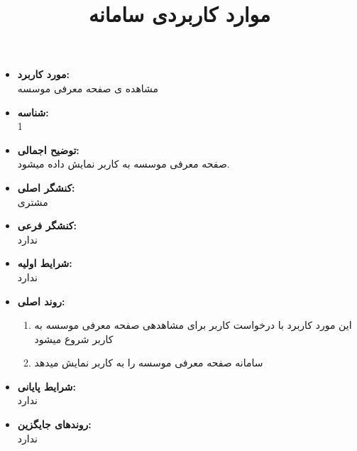 \documentclass{article}
\title{موارد کاربردی سامانه}
\begin{document}
\maketitle
\begin{itemize}
\item \textbf{مورد کاربرد:}\\
مشاهده ی صفحه معرفی موسسه
\item \textbf{شناسه:}\\
1
\item \textbf{توضیح اجمالی:}\\
صفحه معرفی موسسه به کاربر نمایش داده میشود. 
\item \textbf{کنشگر اصلی:}\\
مشتری
\item \textbf{کنشگر فرعی:}\\
ندارد
\item \textbf{شرایط اولیه:}\\
ندارد
\item \textbf{روند اصلی:}\\
\begin{enumerate}
\item  این مورد کاربرد با درخواست کاربر برای مشاهدهی صفحه معرفی موسسه به کاربر شروع میشود
\item سامانه صفحه معرفی موسسه را به کاربر نمایش میدهد
\end{enumerate}
\item \textbf{شرایط پایانی:}\\ 
ندارد
\item \textbf{روندهای جایگزین:}\\
ندارد
\end{itemize}
\noindent\makebox[\linewidth]{\rule{\paperwidth}{0.4pt}}
\end{document}
